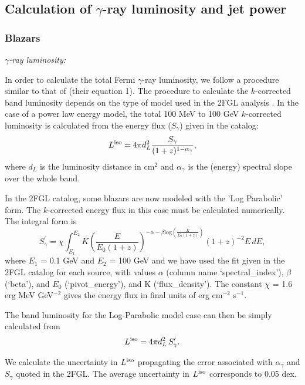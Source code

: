 \documentclass[12pt]{article}
\begin{document}
\subsection*{Calculation of $\gamma$-ray luminosity and jet power}

\subsubsection*{Blazars}

\emph{$\gamma$-ray luminosity:}

In order to calculate the total Fermi $\gamma$-ray luminosity, we follow a procedure similar to that of \cite{sgmt09} (their equation 1). The procedure to calculate the $k$-corrected band luminosity depends on the type of model used in the 2FGL analysis \cite{s2fgl,s2lac}. In the case of a power law energy model, the total 100 MeV to 100 GeV $k$-corrected luminosity is calculated from the energy flux ($S_\gamma$) given in the catalog:
\begin{equation}
L^{\rm iso} = 4\pi d_L^2\frac{S_{\gamma}}{(1 + z)^{1-\alpha_\gamma}},
\end{equation}
where $d_L$ is the luminosity distance in cm$^2$ and $\alpha_\gamma$ is the (energy) spectral slope over the whole band. 

In the 2FGL catalog, some blazars are now modeled with the 'Log
Parabolic' form. The $k$-corrected energy flux in this case must be calculated numerically.  The integral form is
\begin{equation}
S_\gamma^\prime = \chi \int_{E_1}^{E_2} K 
\left(
  \frac{E}{E_0(1+z)}
\right)
^{ -\alpha -\beta
\mathrm{log} \left(\frac{E}{E_0(1+z)}\right)}\left(1+z\right)^{-2}E\,dE,
\end{equation}
where $E_1$ = 0.1 GeV and $E_2$ = 100 GeV and we have used the fit given in the 2FGL catalog for each source, with values $\alpha$ (column name `spectral\_index'), $\beta$ (`beta'), and $E_0$ (`pivot\_energy'), and K (`flux\_density'). The constant $\chi$ = 1.6 erg MeV GeV$^{-2}$ gives the energy flux in final units of erg cm$^{-2}$ s$^{-1}$.

The band luminosity for the Log-Parabolic model case can then be
simply calculated from
\begin{equation}
L^{\rm iso}  = 4\pi d_L^2\,S_{\gamma}^\prime.
\end{equation}

We calculate the uncertainty in $L^{\rm iso}$ propagating the error associated with $\alpha_\gamma$ and $S_\gamma$ quoted in the 2FGL. The average uncertainty in $L^{\rm iso}$ corresponds to 0.05 dex.
\end{document}
